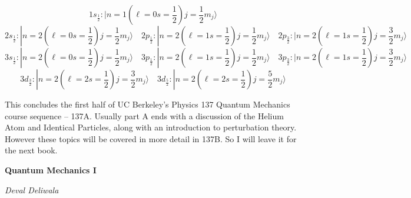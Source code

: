\[ 1s_{\frac{1}{2}}: |n=1 (\ell = 0 s = \frac{1}{2}) j = \frac{1}{2}m_j
\rangle \] 
\[ 2s_{\frac{1}{2}}: |n=2 ( \ell = 0 s = \frac{1}{2} ) j = \frac{1}{2} m_j
  \rangle \quad 2p_{\frac{1}{2}}: |n = 2 ( \ell=1 s = \frac{1}{2} )
  j = \frac{1}{2} m_j \rangle \quad 2p_{\frac{3}{2}}: |n = 2 ( \ell
= 1 s = \frac{1}{2} ) j = \frac{3}{2}m_j \rangle \] 
\[ 3s_{\frac{1}{2}}: |n = 2 (\ell = 0 s = \frac{1}{2} ) j = \frac{1}{2}m_j
  \rangle \quad 3p_{\frac{1}{2}}: |n = 2 ( \ell = 1 s = \frac{1}{2} )
  j = \frac{1}{2} m_j \rangle \quad 3p_{\frac{3}{2}}: |n=2 (\ell
= 1 s = \frac{1}{2} ) j = \frac{3}{2}m_j \rangle \] 
\[ 3d_{\frac{3}{2}}: |n=2 ( \ell = 2 s = \frac{1}{2} ) j = \frac{3}{2}m_j
  \rangle \quad 3d_{\frac{5}{2}}: |n = 2 (\ell = 2s=\frac{1}{2})
j = \frac{5}{2} m_j \rangle \] \vspace{3px} 

\vspace{120px}
This concludes the first half of UC Berkeley's Physics 137 Quantum Mechanics
course sequence -- 137A. Usually part A ends with a discussion of the Helium Atom
and Identical Particles, along with an introduction to perturbation theory. However
these topics will be covered in more detail in 137B. So I will leave it for the next book. 

\vfill 

\begin{center}
  \textbf{Quantum Mechanics I} 
\end{center}

\begin{center}
  \textit{Deval Deliwala}
\end{center}
